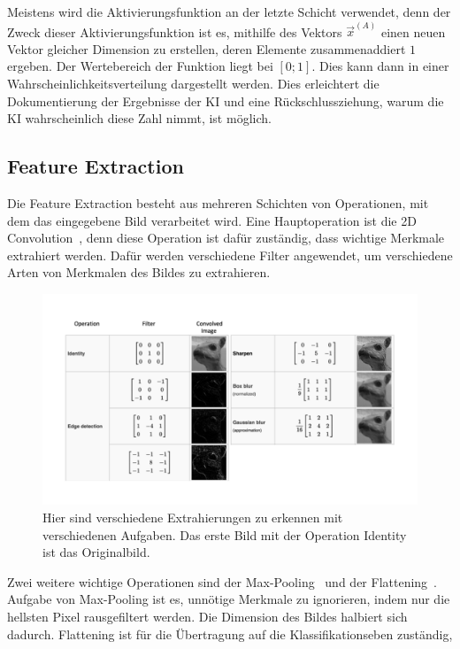 \documentclass[11pt]{article}
\begin{document}
Meistens wird die Aktivierungsfunktion an der letzte Schicht verwendet, denn der Zweck dieser Aktivierungsfunktion ist es, mithilfe des Vektors
$ \vec{x}^{(A)} $ einen neuen Vektor gleicher Dimension zu erstellen, deren Elemente zusammenaddiert $1$ ergeben. Der Wertebereich der Funktion
liegt bei $[0;1]$. Dies kann dann in einer Wahrscheinlichkeitsverteilung dargestellt werden. Dies erleichtert die Dokumentierung der Ergebnisse der KI
und eine Rückschlussziehung, warum die KI wahrscheinlich diese Zahl nimmt, ist möglich.


\subsection{Feature Extraction}\label{feature}
Die Feature Extraction besteht aus mehreren Schichten von Operationen, mit dem das eingegebene Bild verarbeitet wird.
Eine Hauptoperation ist die 2D Convolution~\cite{15}, denn diese Operation ist dafür zuständig, dass wichtige Merkmale extrahiert werden.
Dafür werden verschiedene Filter angewendet, um verschiedene Arten von Merkmalen des Bildes zu extrahieren.
\begin{figure}[h]
    \centering
    \includegraphics[width=400pt, keepaspectratio]{images/filter}
    \caption[Verschiedene Extraktionsmöglichkeiten~\cite{12}]{Hier sind verschiedene Extrahierungen zu erkennen mit verschiedenen Aufgaben. Das erste Bild mit der Operation Identity ist das Originalbild.~\cite{12}}\label{kernel}
\end{figure}
Zwei weitere wichtige Operationen sind der Max-Pooling~\cite{17} und der Flattening~\cite{18}. Aufgabe von Max-Pooling ist es, unnötige Merkmale
zu ignorieren, indem nur die hellsten Pixel rausgefiltert werden. Die Dimension des Bildes halbiert sich dadurch. Flattening ist für die Übertragung auf die Klassifikationseben zuständig,
\end{document}

